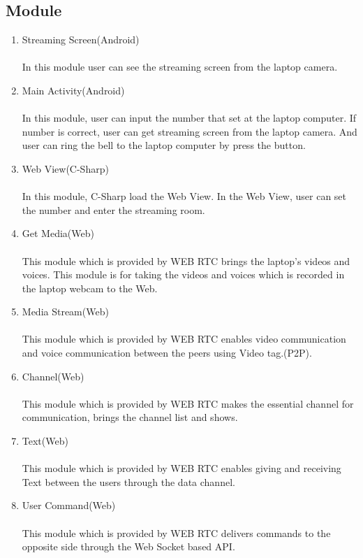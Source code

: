 \documentclass[12pt]{article}
\begin{document}
\subsection*{Module}
\begin{enumerate}
\item Streaming Screen(Android)\\
\\
In this module user can see the streaming screen from the laptop camera. \\

\item Main Activity(Android)\\
\\
In this module, user can input the number that set at the laptop computer. If number is correct, user can get streaming screen from the laptop camera. And user can ring the bell to the laptop computer by press the button.\\

\item Web View(C-Sharp)\\
\\
In this module, C-Sharp load the Web View. In the Web View, user can set the number and enter the streaming room.\\

 \item Get Media(Web)\\
\\
This module which is provided by WEB RTC brings the laptop's videos and voices. This module is for taking the videos and voices which is recorded in the laptop webcam to the Web.\\

\item Media Stream(Web)\\
\\
This module which is provided by WEB RTC enables video communication and voice communication between the peers using Video tag.(P2P).\\

\item Channel(Web)\\
\\
This module which is provided by WEB RTC makes the essential channel for communication, brings the channel list and shows.\\

\item Text(Web)\\
\\
This module which is provided by WEB RTC enables giving and receiving Text between the users through the data channel.\\

\item User Command(Web)\\
\\
This module which is provided by WEB RTC delivers commands to the opposite side through the Web Socket based API.\\

\end{enumerate}
\end{document}
